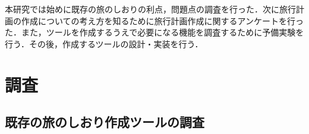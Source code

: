 \documentclass{funthesis}
\begin{document}
本研究では始めに既存の旅のしおりの利点，問題点の調査を行った．次に旅行計画の作成についての考え方を知るために旅行計画作成に関するアンケートを行った．また，ツールを作成するうえで必要になる機能を調査するために予備実験を行う．その後，作成するツールの設計・実装を行う．












\chapter{調査}%

\section{既存の旅のしおり作成ツールの調査}
\end{document}
